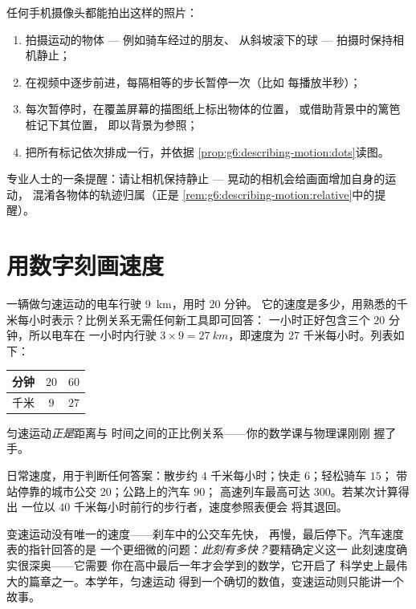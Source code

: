 \begin{method}[制作点迹照片]\label{met:g6:describing-motion:film}
任何手机摄像头都能拍出这样的照片：
\begin{enumerate}
  \item 拍摄运动的物体 --- 例如骑车经过的朋友、
        从斜坡滚下的球 --- 拍摄时保持相机静止；
  \item 在视频中逐步前进，每隔相等的步长暂停一次（比如
        每播放半秒）；
  \item 每次暂停时，在覆盖屏幕的描图纸上标出物体的位置，
        或借助背景中的篱笆桩记下其位置，
        即以背景为参照；
  \item 把所有标记依次排成一行，并依据
        \cref{prop:g6:describing-motion:dots}读图。
\end{enumerate}
专业人士的一条提醒：请让相机保持静止 ---
晃动的相机会给画面增加自身的运动，
混淆各物体的轨迹归属（正是
\cref{rem:g6:describing-motion:relative}中的提醒）。
\end{method}

\section{用数字刻画速度}

\begin{example}[用比例求速度]\label{ex:g6:describing-motion:proportion}
一辆做匀速运动的电车行驶 \qty{9}{km}，用时 $20$ 分钟。
它的速度是多少，用熟悉的千米每小时表示？比例关系无需任何新工具即可回答：
一小时正好包含三个
$20$ 分钟，所以电车在
一小时内行驶 $3 \times 9 = \qty{27}{km}$，即速度为 $27$ 千米每小时。列表如下：
\begin{center}
\begin{tabular}{l|cc}
分钟 & $20$ & $60$ \\
\hline
千米 & $9$ & $27$
\end{tabular}
\end{center}
匀速运动\emph{正是}距离与
时间之间的正比例关系——你的数学课与物理课刚刚
握了手。
\end{example}

\begin{example}[速度参照表]\label{ex:g6:describing-motion:paces}
日常速度，用于判断任何答案：散步约 $4$
千米每小时；快走 $6$；轻松骑车 $15$；
带站停靠的城市公交 $20$；公路上的汽车 $90$；
高速列车最高可达 $300$。若某次计算得出
一位以 $40$ 千米每小时前行的步行者，速度参照表便会
将其退回。
\end{example}

\begin{remark}[瞬时速度]\label{rem:g6:describing-motion:instant}
变速运动没有唯一的速度——刹车中的公交车先快，
再慢，最后停下。汽车速度表的指针回答的是
一个更细微的问题：\emph{此刻有多快？}要精确定义这一
此刻速度确实很深奥——它需要
你在高中最后一年才会学到的数学，它开启了
科学史上最伟大的篇章之一。本学年，匀速运动
得到一个确切的数值，变速运动则只能讲一个故事。
\end{remark}

